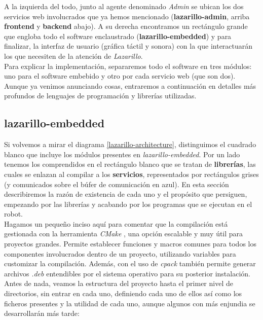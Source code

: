 A la izquierda del todo, junto al agente denominado \textit{Admin} se ubican los dos servicios web involucrados que ya hemos mencionado (\textbf{lazarillo-admin}, arriba \textbf{frontend} y \textbf{backend} abajo). A su derecha encontramos un rectángulo grande que engloba todo el software enclaustrado (\textbf{lazarillo-embedded}) y para finalizar, la interfaz de usuario (gráfica táctil y sonora) con la que interactuarán los que necesiten de la atención de \textit{Lazarillo}.\\

Para explicar la implementación, separaremos todo el software en tres módulos: uno para el software embebido y otro por cada servicio web (que son dos). Aunque ya venimos anunciando cosas, entraremos a continuación en detalles más profundos de lenguajes de programación y librerías utilizadas.\\


\subsection{lazarillo-embedded}

Si volvemos a mirar el diagrama \ref{lazarillo-architecture}, distinguimos el cuadrado blanco que incluye los módulos presentes en \textit{lazarillo-embedded}. Por un lado tenemos los comprendidos en el rectángulo blanco que se tratan de \textbf{librerías}, las cuales se enlazan al compilar a los \textbf{servicios}, representados por rectángulos grises (y comunicados sobre el búfer de comunicación en azul). En esta sección describiremos la razón de existencia de cada uno y el propósito que persiguen, empezando por las librerías y acabando por los programas que se ejecutan en el robot.\\

Hagamos un pequeño inciso aquí para comentar que la compilación está gestionada con la herramienta \textit{CMake} \cite{cmake}, una opción escalable y muy útil para proyectos grandes. Permite establecer funciones y macros comunes para todos los componentes involucrados dentro de un proyecto, utilizando variables para customizar la compilación. Además, con el uso de \emph{cpack} también permite generar archivos \emph{.deb} entendibles por el sistema operativo para su posterior instalación.\\

Antes de nada, veamos la estructura del proyecto hasta el primer nivel de directorios, sin entrar en cada uno, definiendo cada uno de ellos así como los ficheros presentes y la utilidad de cada uno, aunque algunos con más enjundia se desarrollarán más tarde:\\

